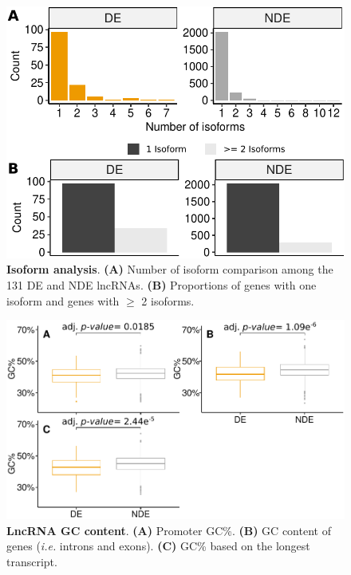 \begin{figure}[ht!]
  \centering
  \includegraphics[scale=0.65]{plots/appendix/dme/isoform.analysis.pdf}
  \caption[Isoform analysis]{\textbf{Isoform analysis}. \textbf{(A)} Number of isoform comparison among the 131 DE and NDE lncRNAs. \textbf{(B)} Proportions of genes with one isoform and genes with $\ge$ 2 isoforms.}
  \label{supp-fig:isoform-analysis}
\end{figure}

\begin{figure}[ht!]
  \centering
  \includegraphics[scale=0.65]{plots/appendix/dme/gc.content.pdf}
  \caption[LncRNA GC content]{\textbf{LncRNA GC content}. \textbf{(A)} Promoter GC\%. \textbf{(B)} GC content of genes (\textit{i.e.} introns and exons). \textbf{(C)} GC\% based on the longest transcript.}
  \label{supp-fig:gc-content}
\end{figure}

